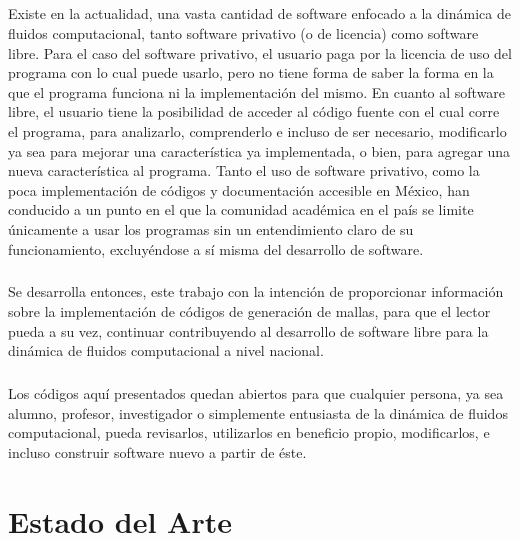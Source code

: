 \documentclass[letterpaper, openright, 12pt]{book}
\begin{document}
    \paragraph*{}
        Existe en la actualidad, una vasta cantidad de software enfocado a la
        dinámica de fluidos computacional, tanto software privativo (o de
        licencia) como software libre. Para el caso del software privativo, el
        usuario paga por la licencia de uso del programa con lo cual puede
        usarlo, pero no tiene forma de saber la forma en la que el programa
        funciona ni la implementación del mismo. En cuanto al software libre,
        el usuario tiene la posibilidad de acceder al código fuente con el cual
        corre el programa, para analizarlo, comprenderlo e incluso de ser
        necesario, modificarlo ya sea para mejorar una característica ya
        implementada, o bien, para agregar una nueva característica al programa.
        Tanto el uso de software privativo, como la poca implementación de
        códigos y documentación accesible en México, han conducido a un punto en
        el que la comunidad académica en el país se limite únicamente a usar los
        programas sin un entendimiento claro de su funcionamiento, excluyéndose
        a sí misma del desarrollo de software.
    \paragraph*{}
        Se desarrolla entonces, este trabajo con la intención de proporcionar
        información sobre la implementación de códigos de generación de mallas,
        para que el lector pueda a su vez, continuar contribuyendo al desarrollo
        de software libre para la dinámica de fluidos computacional a nivel
        nacional.

    \paragraph*{}
        Los códigos aquí presentados quedan abiertos para que cualquier persona,
        ya sea alumno, profesor, investigador o  simplemente entusiasta de la
        dinámica de fluidos computacional, pueda revisarlos, utilizarlos en
        beneficio propio, modificarlos, e incluso construir software nuevo a
        partir de éste.

%
%
%
%

%
%
%
%
    \chapter{Estado del Arte}
\end{document}
